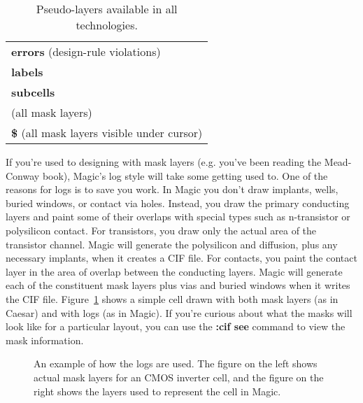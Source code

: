 \documentclass[letterpaper,twoside,12pt]{article}
\begin{document}
\begin{table}[hb]
   \begin{center}
      \begin{tabular}{|l|} \hline
         {\bfseries errors} (design-rule violations) \\
         {\bfseries labels} \\
         {\bfseries subcells} \\
         {\bfseries \*} (all mask layers) \\
         {\bfseries \$} (all mask layers visible under cursor) \\ \hline
      \end{tabular}
   \end{center}
   \caption{Pseudo-layers available in all technologies.}
   \label{pseudolayers}
\end{table}

If you're used to designing with mask layers (e.g. you've
been reading the Mead-Conway book), Magic's log style
will take some getting used to.
One of the reasons for logs is to
save you work.  In Magic you don't draw implants, wells, buried
windows, or contact via holes.  Instead, you draw the primary
conducting layers and paint some of their overlaps with
special types such as n-transistor or polysilicon contact.
For transistors, you draw only the
actual area of the transistor channel.  Magic will generate
the polysilicon and diffusion, plus any
necessary implants, when it creates a CIF file.  For contacts,
you paint the contact layer in the area of overlap between
the conducting layers.  Magic
will generate each of the constituent mask layers plus
vias and buried windows when it writes the CIF file. 
Figure~\ref{layers1}
shows a simple cell drawn with both mask layers (as in Caesar)
and with logs (as in Magic).  If you're curious about what
the masks will look like for a particular layout, you can use
the {\bfseries :cif see} command to view the mask information.

\begin{figure}[ht]
   \begin{center}
   \begin{minipage}{0.3\columnwidth}
   \end{minipage} \hspace*{0.5in}
   \begin{minipage}{0.5\columnwidth}
   \end{minipage}
   \caption {An example of how the logs are used.  The figure on
	the left shows actual mask layers for an CMOS inverter
	cell, and the figure on the right shows the layers used
	to represent the cell in Magic.}
   \label{layers1}
   \end{center}
\end{figure}
\end{document}
